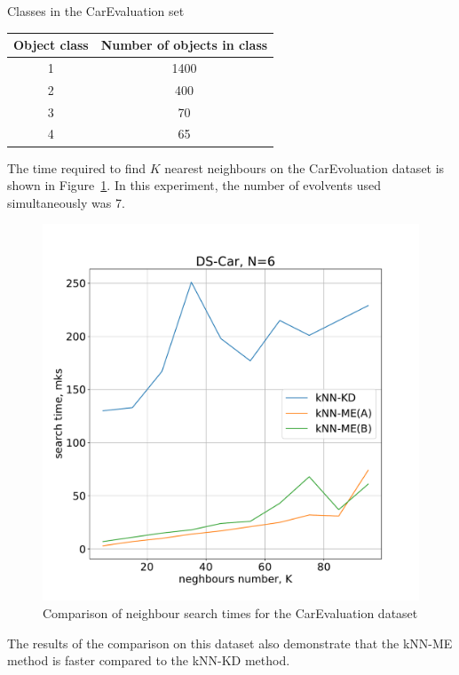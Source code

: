 \documentclass[entropy,article,submit,moreauthors,pdftex]{Definitions/mdpi}
\begin{document}
\begin{paracol}{2}
\begin{specialtable}[H] 
  \caption{Classes in the CarEvaluation set}\label{tab:t2}
	\center
\begin{tabular}{cc}
\toprule
	  Object class & Number of objects in class \\
\midrule													
		1 & 1400 \\ 
		2 & 400 \\
		3 & 70 \\
		4 & 65 \\
\bottomrule
\end{tabular}
\end{specialtable}

The time required to find $K$ nearest neighbours on the CarEvoluation dataset is shown in Figure~\ref{fig6a}. In this experiment, the number of evolvents used simultaneously was 7. 
\begin{figure}
\widefigure
\includegraphics[width=0.5\linewidth]{fig6a.pdf}
\caption{Comparison of neighbour search times for the CarEvaluation dataset\label{fig6a}}
\end{figure}
The results of the comparison on this dataset also demonstrate that the kNN-ME method is faster compared to the kNN-KD method.


\end{paracol}
\end{document}
